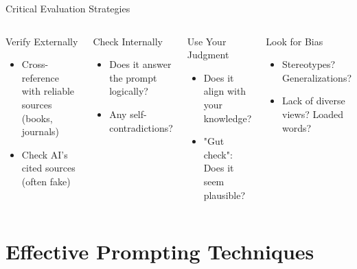\documentclass{beamer}
\begin{document}
\begin{frame}{Critical Evaluation Strategies}
\begin{columns}
\begin{block}{Verify Externally}
\begin{itemize}
\item Cross-reference with reliable sources (books, journals)
\item Check AI's cited sources (often fake)
\end{itemize}
\end{block}
\pause
\begin{block}{Check Internally}
\begin{itemize}
\item Does it answer the prompt logically?
\item Any self-contradictions?
\end{itemize}
\end{block}
\pause
\begin{block}{Use Your Judgment}
\begin{itemize}
\item Does it align with your knowledge?
\item "Gut check": Does it seem plausible?
\end{itemize}
\end{block}
\pause
\begin{block}{Look for Bias}
\begin{itemize}
\item Stereotypes? Generalizations?
\item Lack of diverse views? Loaded words?
\end{itemize}
\end{block}
\end{columns}
\end{frame}

\section{Effective Prompting Techniques}
\end{document}
